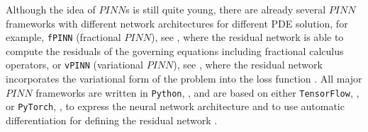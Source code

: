 Although the idea of $PINN$s is still quite young, there are already several $PINN$ frameworks with different network architectures for different PDE solution, for example, \lstinline!fPINN! (fractional $PINN$), see \cite{PangLuKarniadakis:2019}, where the residual network is able to compute the residuals of the governing equations including fractional calculus operators, or \lstinline!vPINN! (variational $PINN$), see \cite{KharazmiZhangKarniadakis:2019}, where the residual network incorporates the variational form of the problem into the loss function \cite[pp.~5-6]{Markidis:2021}. All major $PINN$ frameworks are written in \lstinline!Python!, \cite{Python}, and are based on either \lstinline!TensorFlow!, \cite{TensorFlow}, or \lstinline!PyTorch!, \cite{PyTorch}, to express the neural network architecture and to use automatic differentiation for defining the residual network \cite[p.~6]{Markidis:2021}. 

